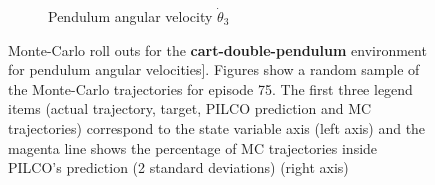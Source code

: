 \begin{figure}[htp!]
\begin{subfigure}[b]{1\linewidth}
    \caption{Pendulum angular velocity $\dot{\theta}_3$} 
    \label{Fig:Re-cdp-pen3-velocity} 
  \end{subfigure} 

\caption[Monte-Carlo roll outs for \textbf{cart-double-pendulum} pendulum angular velocities]{Monte-Carlo roll outs for the \textbf{cart-double-pendulum} environment for  pendulum angular velocities]. Figures show a random sample of the Monte-Carlo trajectories for episode 75. The first three legend items (actual trajectory, target, PILCO prediction and MC trajectories) correspond to the state variable axis (left axis) and the magenta line shows the percentage of MC trajectories inside PILCO's prediction (2 standard deviations) (right axis)}
\label{Re:cdp-MC-roll-outs-2} 
\end{figure}
 
